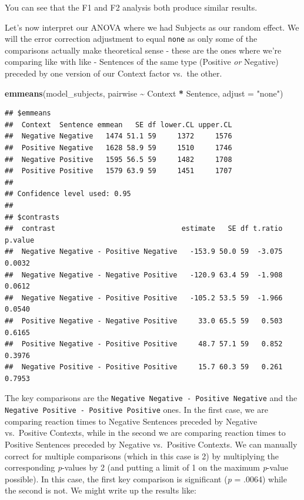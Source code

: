 \documentclass[
]{book}
\newenvironment{Shaded}{\begin{snugshade}}{\end{snugshade}}
\newcommand{\AttributeTok}[1]{\textcolor[rgb]{0.13,0.29,0.53}{#1}}
\newcommand{\FunctionTok}[1]{\textcolor[rgb]{0.13,0.29,0.53}{\textbf{#1}}}
\newcommand{\NormalTok}[1]{#1}
\newcommand{\SpecialCharTok}[1]{\textcolor[rgb]{0.81,0.36,0.00}{\textbf{#1}}}
\newcommand{\StringTok}[1]{\textcolor[rgb]{0.31,0.60,0.02}{#1}}
\begin{document}
You can see that the F1 and F2 analysis both produce similar results.

Let's now interpret our ANOVA where we had Subjects as our random effect. We will the error correction adjustment to equal \texttt{none} as only some of the comparisons actually make theoretical sense - these are the ones where we're comparing like with like - Sentences of the same type (Positive \emph{or} Negative) preceded by one version of our Context factor vs.~the other.

\begin{Shaded}
\begin{Highlighting}[]
\FunctionTok{emmeans}\NormalTok{(model\_subjects, pairwise }\SpecialCharTok{\textasciitilde{}}\NormalTok{ Context }\SpecialCharTok{*}\NormalTok{ Sentence, }\AttributeTok{adjust =} \StringTok{"none"}\NormalTok{)}
\end{Highlighting}
\end{Shaded}

\begin{verbatim}
## $emmeans
##  Context  Sentence emmean   SE df lower.CL upper.CL
##  Negative Negative   1474 51.1 59     1372     1576
##  Positive Negative   1628 58.9 59     1510     1746
##  Negative Positive   1595 56.5 59     1482     1708
##  Positive Positive   1579 63.9 59     1451     1707
## 
## Confidence level used: 0.95 
## 
## $contrasts
##  contrast                              estimate   SE df t.ratio p.value
##  Negative Negative - Positive Negative   -153.9 50.0 59  -3.075  0.0032
##  Negative Negative - Negative Positive   -120.9 63.4 59  -1.908  0.0612
##  Negative Negative - Positive Positive   -105.2 53.5 59  -1.966  0.0540
##  Positive Negative - Negative Positive     33.0 65.5 59   0.503  0.6165
##  Positive Negative - Positive Positive     48.7 57.1 59   0.852  0.3976
##  Negative Positive - Positive Positive     15.7 60.3 59   0.261  0.7953
\end{verbatim}

The key comparisons are the \texttt{Negative\ Negative\ -\ Positive\ Negative} and the \texttt{Negative\ Positive\ -\ Positive\ Positive} ones. In the first case, we are comparing reaction times to Negative Sentences preceded by Negative vs.~Positive Contexts, while in the second we are comparing reaction times to Positive Sentences preceded by Negative vs.~Positive Contexts. We can manually correct for multiple comparisons (which in this case is 2) by multiplying the corresponding \emph{p}-values by 2 (and putting a limit of 1 on the maximum \emph{p}-value possible). In this case, the first key comparison is significant (\emph{p} = .0064) while the second is not. We might write up the results like:
\end{document}
